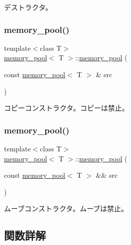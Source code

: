 デストラクタ。 \hypertarget{classmemory__pool_a38c023c3361ac0ee78d8e34ab7f8d668}{}\label{classmemory__pool_a38c023c3361ac0ee78d8e34ab7f8d668} 
\subsubsection{\texorpdfstring{memory\+\_\+pool()}{memory\_pool()}\hspace{0.1cm}{\footnotesize\ttfamily [2/3]}}
{\footnotesize\ttfamily template$<$class T$>$ \\
\hyperlink{classmemory__pool}{memory\+\_\+pool}$<$ T $>$\+::\hyperlink{classmemory__pool}{memory\+\_\+pool} (\begin{DoxyParamCaption}\item[{const \hyperlink{classmemory__pool}{memory\+\_\+pool}$<$ T $>$ \&}]{src }\end{DoxyParamCaption})\hspace{0.3cm}{\ttfamily [delete]}}

コピーコンストラクタ。コピーは禁止。 \hypertarget{classmemory__pool_acff04411638a2a888d522194b2283b5d}{}\label{classmemory__pool_acff04411638a2a888d522194b2283b5d} 
\subsubsection{\texorpdfstring{memory\+\_\+pool()}{memory\_pool()}\hspace{0.1cm}{\footnotesize\ttfamily [3/3]}}
{\footnotesize\ttfamily template$<$class T$>$ \\
\hyperlink{classmemory__pool}{memory\+\_\+pool}$<$ T $>$\+::\hyperlink{classmemory__pool}{memory\+\_\+pool} (\begin{DoxyParamCaption}\item[{const \hyperlink{classmemory__pool}{memory\+\_\+pool}$<$ T $>$ \&\&}]{src }\end{DoxyParamCaption})\hspace{0.3cm}{\ttfamily [delete]}}

ムーブコンストラクタ。ムーブは禁止。 

\subsection{関数詳解}
\hypertarget{classmemory__pool_ab5d59f7eeb28c0c983bc68566a375a14}{}\label{classmemory__pool_ab5d59f7eeb28c0c983bc68566a375a14} 
